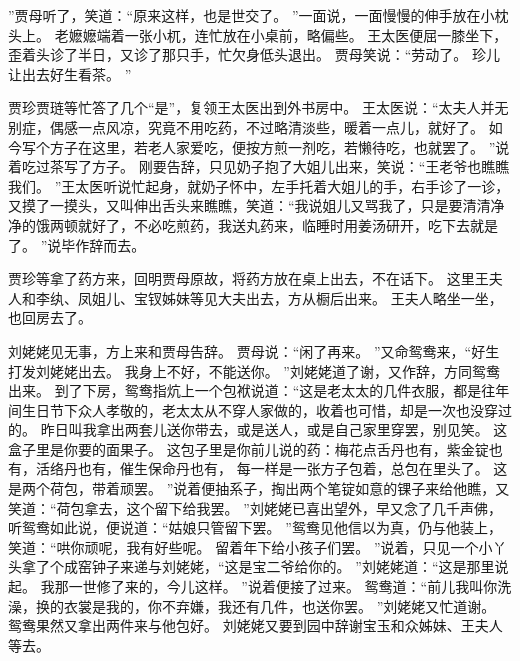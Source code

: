 ”贾母听了，笑道：“原来这样，也是世交了。
”一面说，一面慢慢的伸手放在小枕头上。
老嬷嬷端着一张小杌，连忙放在小桌前，略偏些。
王太医便屈一膝坐下，歪着头诊了半日，又诊了那只手，忙欠身低头退出。
贾母笑说：“劳动了。
珍儿让出去好生看茶。
”\par
贾珍贾琏等忙答了几个“是”，复领王太医出到外书房中。
王太医说：“太夫人并无别症，偶感一点风凉，究竟不用吃药，不过略清淡些，暖着一点儿，就好了。
如今写个方子在这里，若老人家爱吃，便按方煎一剂吃，若懒待吃，也就罢了。
”说着吃过茶写了方子。
刚要告辞，只见奶子抱了大姐儿出来，笑说：“王老爷也瞧瞧我们。
”王太医听说忙起身，就奶子怀中，左手托着大姐儿的手，右手诊了一诊，又摸了一摸头，又叫伸出舌头来瞧瞧，笑道：“我说姐儿又骂我了，只是要清清净净的饿两顿就好了，不必吃煎药，我送丸药来，临睡时用姜汤研开，吃下去就是了。
”说毕作辞而去。
\par
贾珍等拿了药方来，回明贾母原故，将药方放在桌上出去，不在话下。
这里王夫人和李纨、凤姐儿、宝钗姊妹等见大夫出去，方从橱后出来。
王夫人略坐一坐，也回房去了。
\par
刘姥姥见无事，方上来和贾母告辞。
贾母说：“闲了再来。
”又命鸳鸯来，“好生打发刘姥姥出去。
我身上不好，不能送你。
”刘姥姥道了谢，又作辞，方同鸳鸯出来。
到了下房，鸳鸯指炕上一个包袱说道：“这是老太太的几件衣服，都是往年间生日节下众人孝敬的，老太太从不穿人家做的，收着也可惜，却是一次也没穿过的。
昨日叫我拿出两套儿送你带去，或是送人，或是自己家里穿罢，别见笑。
这盒子里是你要的面果子。
这包子里是你前儿说的药：梅花点舌丹也有，紫金锭也有，活络丹也有，催生保命丹也有，
每一样是一张方子包着，总包在里头了。
这是两个荷包，带着顽罢。
”说着便抽系子，掏出两个笔锭如意的锞子来给他瞧，又笑道：“荷包拿去，这个留下给我罢。
”刘姥姥已喜出望外，早又念了几千声佛，听鸳鸯如此说，便说道：“姑娘只管留下罢。
”鸳鸯见他信以为真，仍与他装上，笑道：“哄你顽呢，我有好些呢。
留着年下给小孩子们罢。
”说着，只见一个小丫头拿了个成窑钟子来递与刘姥姥，“这是宝二爷给你的。
”刘姥姥道：“这是那里说起。
我那一世修了来的，今儿这样。
”说着便接了过来。
鸳鸯道：“前儿我叫你洗澡，换的衣裳是我的，你不弃嫌，我还有几件，也送你罢。
”刘姥姥又忙道谢。
鸳鸯果然又拿出两件来与他包好。
刘姥姥又要到园中辞谢宝玉和众姊妹、王夫人等去。
